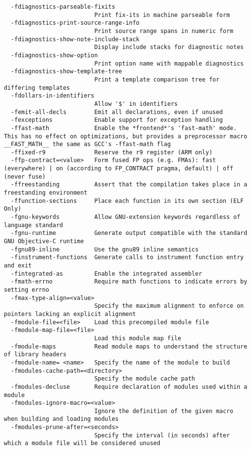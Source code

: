 \begin{verbatim}
  -fdiagnostics-parseable-fixits
                          Print fix-its in machine parseable form
  -fdiagnostics-print-source-range-info
                          Print source range spans in numeric form
  -fdiagnostics-show-note-include-stack
                          Display include stacks for diagnostic notes
  -fdiagnostics-show-option
                          Print option name with mappable diagnostics
  -fdiagnostics-show-template-tree
                          Print a template comparison tree for differing templates
  -fdollars-in-identifiers
                          Allow '$' in identifiers
  -femit-all-decls        Emit all declarations, even if unused
  -fexceptions            Enable support for exception handling
  -ffast-math             Enable the *frontend*'s 'fast-math' mode. This has no effect on optimizations, but provides a preprocessor macro __FAST_MATH__ the same as GCC's -ffast-math flag
  -ffixed-r9              Reserve the r9 register (ARM only)
  -ffp-contract=<value>   Form fused FP ops (e.g. FMAs): fast (everywhere) | on (according to FP_CONTRACT pragma, default) | off (never fuse)
  -ffreestanding          Assert that the compilation takes place in a freestanding environment
  -ffunction-sections     Place each function in its own section (ELF Only)
  -fgnu-keywords          Allow GNU-extension keywords regardless of language standard
  -fgnu-runtime           Generate output compatible with the standard GNU Objective-C runtime
  -fgnu89-inline          Use the gnu89 inline semantics
  -finstrument-functions  Generate calls to instrument function entry and exit
  -fintegrated-as         Enable the integrated assembler
  -fmath-errno            Require math functions to indicate errors by setting errno
  -fmax-type-align=<value>
                          Specify the maximum alignment to enforce on pointers lacking an explicit alignment
  -fmodule-file=<file>    Load this precompiled module file
  -fmodule-map-file=<file>
                          Load this module map file
  -fmodule-maps           Read module maps to understand the structure of library headers
  -fmodule-name= <name>   Specify the name of the module to build
  -fmodules-cache-path=<directory>
                          Specify the module cache path
  -fmodules-decluse       Require declaration of modules used within a module
  -fmodules-ignore-macro=<value>
                          Ignore the definition of the given macro when building and loading modules
  -fmodules-prune-after=<seconds>
                          Specify the interval (in seconds) after which a module file will be considered unused

\end{verbatim}

